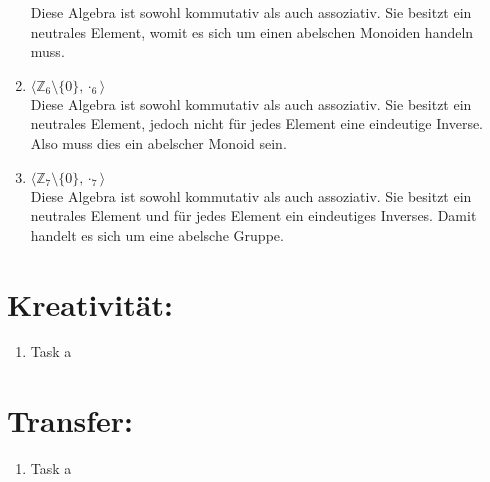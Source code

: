 \begin{enumerate}[label=(\alph*)]
        Diese Algebra ist sowohl kommutativ als auch assoziativ. Sie besitzt ein neutrales Element, womit es sich um einen abelschen Monoiden handeln muss.
        \item $\langle \mathbb{Z}_6 \setminus \{0\}, {\cdot}_6 \rangle$ \\
        Diese Algebra ist sowohl kommutativ als auch assoziativ. Sie besitzt ein neutrales Element, jedoch nicht für jedes Element eine eindeutige Inverse. Also muss dies ein abelscher Monoid sein.
        \item $\langle \mathbb{Z}_7 \setminus \{0\}, {\cdot}_7 \rangle$ \\
        Diese Algebra ist sowohl kommutativ als auch assoziativ. Sie besitzt ein neutrales Element und für jedes Element ein eindeutiges Inverses. Damit handelt es sich um eine  abelsche Gruppe.
        
    \end{enumerate}
    \section*{Kreativität:}
    \begin{enumerate}[label=(\alph*)]
    	\item Task a
    \end{enumerate}
    \section*{Transfer:}
    \begin{enumerate}[label=(\alph*)]
    	\item Task a
    \end{enumerate}







